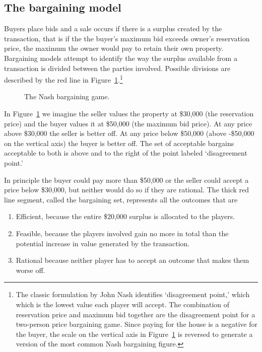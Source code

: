 \subsection{The bargaining model} \label{sec:bargaining-model}
Buyers place bids and a sale occurs if there is a surplus created by the transaction, that is if the the buyer's maximum bid exceeds owner's \gls{reservation price}, the maximum the owner would pay to retain their own property. 
Bargaining models attempt to identify the way the surplus available from a transaction is divided between the parties involved. Possible divisions are described by the red line in Figure~\ref{fig:Nash-bargaining-game}.\footnote{The classic  formulation by John Nash %
identifies  `\gls{disagreement point},' which which is the  lowest value each player will accept. The combination of reservation price and maximum bid together are the disagreement point for a two-person price bargaining game. Since paying for the house is a negative for the buyer, the scale on the vertical axis  in Figure~\ref{fig:Nash-bargaining-game} is reversed to generate a version of the most common Nash bargaining figure.} 

\begin{figure}
\centering

\caption[The Nash bargaining game]{The Nash bargaining game.}
\label{fig:Nash-bargaining-game}
\end{figure}


In Figure~\ref{fig:Nash-bargaining-game} we imagine the seller values the property at \$30,000 (the reservation price) and the buyer values it at \$50,000 (the maximum bid price).  At any price above \$30,000 the seller is better off. At any price below \$50,000 (above -\$50,000 on the vertical axis) the buyer is better off. 
The set of acceptable bargains acceptable to both is above and to the right of the point labeled `disagreement point.' 

In principle the buyer could pay more than \$50,000 or the seller could accept a price below \$30,000, but neither would do so if they are rational. 
The thick red line segment, called the bargaining set, represents all the outcomes that are\begin{enumerate}
    \item Efficient, because the entire \$20,000 surplus is allocated to the players. 
    \item Feasible, because the players involved gain no more in total than the potential increase in value generated by the transaction.
    \item Rational because neither player has to accept an outcome that makes them worse off.
\end{enumerate}   

